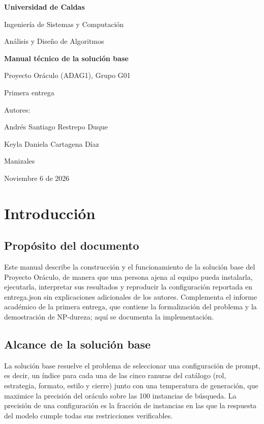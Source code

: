 \documentclass[12pt,letterpaper]{article}
\theoremstyle{definition}
\begin{document}
\begin{titlepage}
\centering
\vspace*{1cm}
{\bfseries Universidad de Caldas}\par
Ingeniería de Sistemas y Computación\par
Análisis y Diseño de Algoritmos\par
\vspace{4cm}
{\bfseries Manual técnico de la solución base}\par
Proyecto Oráculo (ADAG1), Grupo G01\par
Primera entrega\par
\vspace{4cm}
Autores:\par
Andrés Santiago Restrepo Duque\par
Keyla Daniela Cartagena Díaz\par
\vfill
Manizales\par
Noviembre 6 de 2026\par
\end{titlepage}

\renewcommand{\contentsname}{\centering Contenido}
\tableofcontents
\newpage

\section{Introducción}

\subsection{Propósito del documento}
Este manual describe la construcción y el funcionamiento de la solución base del Proyecto Oráculo, de manera que una persona ajena al equipo pueda instalarla, ejecutarla, interpretar sus resultados y reproducir la configuración reportada en entrega.json sin explicaciones adicionales de los autores. Complementa el informe académico de la primera entrega, que contiene la formalización del problema y la demostración de NP-dureza; aquí se documenta la implementación.

\subsection{Alcance de la solución base}
La solución base resuelve el problema de seleccionar una configuración de prompt, es decir, un índice para cada una de las cinco ranuras del catálogo (rol, estrategia, formato, estilo y cierre) junto con una temperatura de generación, que maximice la precisión del oráculo sobre las 100 instancias de búsqueda. La precisión de una configuración es la fracción de instancias en las que la respuesta del modelo cumple todas sus restricciones verificables.
\end{document}

